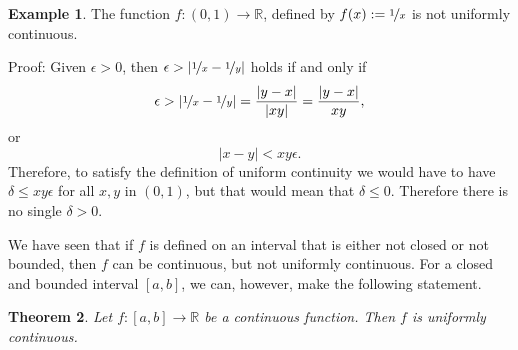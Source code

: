 \documentclass[12pt]{book}
\newcommand{\abs}[1]{\left\lvert {#1} \right\rvert}
\newcommand{\R}{{\mathbb{R}}}
\theoremstyle{plain}
\newtheorem{thm}{Theorem}[section]
\theoremstyle{remark}
\theoremstyle{definition}
\theoremstyle{exercise}
\theoremstyle{example}
\newtheorem{example}[thm]{Example}
\begin{document}
\begin{example}
The function $f \colon (0,1) \to \R$, defined by $f(x) := \nicefrac{1}{x}$ is not
uniformly continuous.

Proof: Given $\epsilon > 0$, then $\epsilon >
\abs{\nicefrac{1}{x}-\nicefrac{1}{y}}$ holds if and only if
\begin{equation*}
\epsilon >
\abs{\nicefrac{1}{x}-\nicefrac{1}{y}}
=
\frac{\abs{y-x}}{\abs{xy}} 
=
\frac{\abs{y-x}}{xy} ,
\end{equation*}
or
\begin{equation*}
\abs{x-y} < xy \epsilon .
\end{equation*}
Therefore, to satisfy the definition of uniform continuity we would have to
have $\delta \leq xy \epsilon$ for all $x,y$ in $(0,1)$, but that would mean
that $\delta \leq 0$.  Therefore there is no single $\delta > 0$.
\end{example}

We have seen that if $f$ is defined on an interval that is either not closed
or not bounded, then $f$ can be continuous, but not uniformly continuous.
For a closed and bounded interval $[a,b]$, we can, however,
make the following statement.

\begin{thm} \label{unifcont:thm}
Let $f \colon [a,b] \to \R$ be a continuous function.  Then $f$
is uniformly continuous.
\end{thm}
\end{document}
